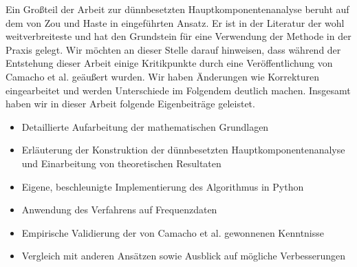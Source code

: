 Ein Großteil der Arbeit zur dünnbesetzten Hauptkomponentenanalyse beruht auf dem von Zou und Haste in \cite{zou_sparsepca} eingeführten Ansatz. Er ist in der Literatur der wohl weitverbreiteste und hat den Grundstein für eine Verwendung der Methode in der Praxis gelegt. Wir möchten an dieser Stelle darauf hinweisen, dass während der Entstehung dieser Arbeit einige Kritikpunkte durch eine Veröffentlichung von Camacho et al. \cite{camacho} geäußert wurden. Wir haben Änderungen wie Korrekturen eingearbeitet und werden Unterschiede im Folgendem deutlich machen. Insgesamt haben wir in dieser Arbeit folgende Eigenbeiträge geleistet.
\begin{itemize}
\item Detaillierte Aufarbeitung der mathematischen Grundlagen
\item Erläuterung der Konstruktion der dünnbesetzten Hauptkomponentenanalyse und Einarbeitung von theoretischen Resultaten
\item Eigene, beschleunigte Implementierung des Algorithmus in Python
\item Anwendung des Verfahrens auf Frequenzdaten
\item Empirische Validierung der von Camacho et al. gewonnenen Kenntnisse
\item Vergleich mit anderen Ansätzen sowie Ausblick auf mögliche Verbesserungen
\end{itemize}